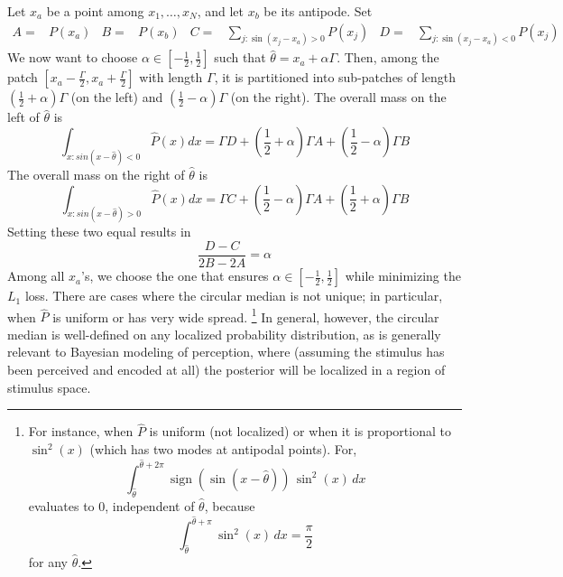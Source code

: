Let $x_a$ be a point among $x_1, \dots, x_N$, and let $x_b$ be its antipode.
Set
\begin{align*}
    A =& P(x_a) &
    B =& P(x_b) &
    C =& \sum_{j : \sin(x_j-x_a) > 0} P(x_j)&
    D =& \sum_{j : \sin(x_j-x_a) < 0} P(x_j)
\end{align*}
We now want to choose $\alpha \in [-\frac{1}{2},\frac{1}{2}]$ such that $\widehat{\theta} = x_a + \alpha\Gamma$.
Then, among the patch $[x_a-\frac{\Gamma}{2}, x_a+\frac{\Gamma}{2}]$ with length $\Gamma$, it is partitioned into sub-patches of length $(\frac{1}{2}+\alpha) \Gamma$ (on the left) and $(\frac{1}{2}-\alpha) \Gamma$ (on the right).
The overall mass on the left of $\widehat{\theta}$ is
\begin{equation}
  \int_{x : sin(x-\widehat{\theta}) < 0} \widehat{P}(x) dx =  \Gamma D + \left(\frac{1}{2}+\alpha\right) \Gamma A + \left(\frac{1}{2}-\alpha\right) \Gamma B
\end{equation}
The overall mass on the right of $\widehat{\theta}$ is
\begin{equation}
  \int_{x : sin(x-\widehat{\theta}) > 0} \widehat{P}(x) dx =  \Gamma C + \left(\frac{1}{2}-\alpha\right) \Gamma A + \left(\frac{1}{2}+\alpha\right) \Gamma B
\end{equation}
Setting these two equal results in
\begin{equation}\label{eq:median-alpha}
    \frac{D -C}{2B-2A} =   \alpha
\end{equation}
Among all $x_a$'s, we choose the one that ensures $\alpha \in [-\frac{1}{2}, \frac{1}{2}]$ while minimizing the $L_1$ loss. There are cases where the circular median is not unique; in particular, when $\widehat{P}$ is uniform or has very wide spread. 
\footnote{For instance, when $\widehat{P}$ is uniform (not localized) or when it is proportional to $\sin^2(x)$ (which has two modes at antipodal points).
For, 
\[
\int_{\widehat{\theta}}^{\widehat{\theta}+2\pi} \operatorname{sign}(\sin(x-\widehat{\theta}))\,\sin^2(x)\,dx
\]
evaluates to \(0\), independent of \(\widehat{\theta}\), because 
\[
\int_{\widehat{\theta}}^{\widehat{\theta}+\pi} \sin^2(x)\,dx = \frac{\pi}{2}
\] for any $\widehat{\theta}$.
}
In general, however, the circular median is well-defined on any  localized probability distribution, as is generally relevant to Bayesian modeling of perception, where (assuming the stimulus has been perceived and encoded at all) the posterior will be localized in a region of stimulus space. 
